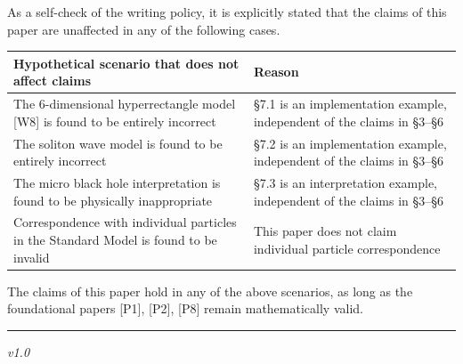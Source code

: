 \documentclass[
  a4paper,11pt]{article}
\newcounter{none} %
\begin{document}
As a self-check of the writing policy, it is explicitly stated that the
claims of this paper are unaffected in any of the following cases.

{\def\LTcaptype{none} %
\begin{longtable}[]{@{}
  >{\raggedright\arraybackslash}p{}
  >{\raggedright\arraybackslash}p{}@{}}
\toprule\noalign{}
\begin{minipage}[b]{\linewidth}\raggedright
Hypothetical scenario that does not affect claims
\end{minipage} & \begin{minipage}[b]{\linewidth}\raggedright
Reason
\end{minipage} \\
\midrule\noalign{}
\endhead
\bottomrule\noalign{}
\endlastfoot
The 6-dimensional hyperrectangle model {[}W8{]} is found to be entirely
incorrect & §7.1 is an implementation example, independent of the claims
in §3--§6 \\
The soliton wave model is found to be entirely incorrect & §7.2 is an
implementation example, independent of the claims in §3--§6 \\
The micro black hole interpretation is found to be physically
inappropriate & §7.3 is an interpretation example, independent of the
claims in §3--§6 \\
Correspondence with individual particles in the Standard Model is found
to be invalid & This paper does not claim individual particle
correspondence \\
\end{longtable}
}

The claims of this paper hold in any of the above scenarios, as long as
the foundational papers {[}P1{]}, {[}P2{]}, {[}P8{]} remain
mathematically valid.

\begin{center}\rule{0.5\linewidth}{0.5pt}\end{center}

\emph{v1.0}
\end{document}

